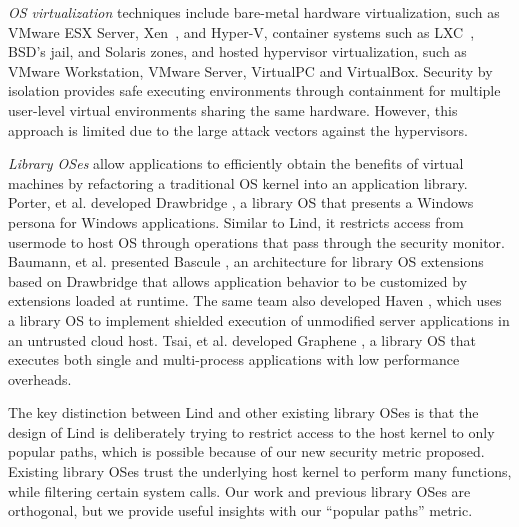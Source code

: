 \textit{OS virtualization}
techniques include
bare-metal hardware virtualization, such as VMware ESX Server, Xen~\cite{Xen-03},
and Hyper-V, container systems such as LXC~\cite{LXC}, BSD's jail, and Solaris zones, and
hosted hypervisor virtualization, such as VMware
Workstation, VMware Server, VirtualPC and VirtualBox.
Security by isolation \cite{Qubes, Overshadow, SecureVM, HypSec}
provides safe executing environments through containment for multiple
user-level virtual environments sharing the same hardware.
However, this approach is limited due to
the large attack vectors against the hypervisors.

\textit{Library OSes}
allow applications to efficiently obtain the benefits of virtual machines
by refactoring a traditional OS kernel into an application library.
Porter, et al. developed Drawbridge \cite{Drawbridge-11},
a library OS
that presents a Windows persona for %
Windows applications. Similar to Lind,
it restricts access from usermode to host OS through
operations that pass through the security monitor.
%
%
Baumann, et al. presented Bascule \cite{Bascule}, an architecture for library OS extensions
based on Drawbridge that allows application behavior to be customized by
extensions loaded at runtime. The same team also developed Haven \cite{Haven},
which uses a library OS to implement
shielded execution of unmodified server applications
in an untrusted cloud host.
Tsai, et al. developed Graphene \cite{Graphene-14}, a library OS that
executes both single and
multi-process applications with low performance overheads.

The key distinction between Lind and other existing library OSes is that the design of Lind 
is deliberately trying to restrict access to the host kernel to only popular paths, which is possible 
because of our new security metric proposed. Existing library OSes trust the underlying host kernel to perform many functions, 
while filtering certain system calls. 
Our work and previous library OSes are orthogonal, but we provide useful insights with our ``popular paths'' metric. 



